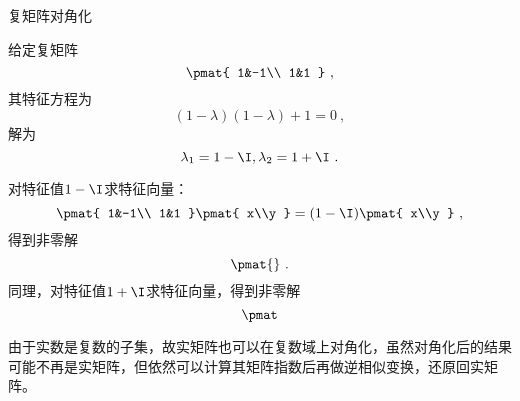 \begin{example}{复矩阵对角化}

给定复矩阵
\begin{equation}
\pmat{
    1&-1\\
    1&1
}~, 
\end{equation}
其特征方程为
\begin{equation}
(1-\lambda)(1-\lambda)+1=0~, 
\end{equation}
解为
\begin{equation}
\lambda_1 = 1-\I, \lambda_2 = 1+\I~. 
\end{equation}

对特征值$1-\I$求特征向量：
\begin{equation}
\pmat{
    1&-1\\
    1&1
}
\pmat{
    x\\y
}
=
(1-\I)
\pmat{
    x\\y
}~, 
\end{equation}
得到非零解
\begin{equation}
\pmat{

}~. 
\end{equation}
同理，对特征值$1+\I$求特征向量，得到非零解
\begin{equation}
\pmat
\end{equation}

\end{example}


由于实数是复数的子集，故实矩阵也可以在复数域上对角化，虽然对角化后的结果可能不再是实矩阵，但依然可以计算其矩阵指数后再做逆相似变换，还原回实矩阵。














